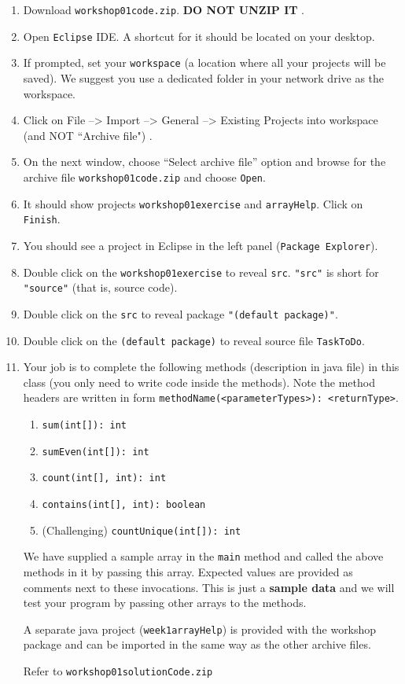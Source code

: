 \begin{questions}
\begin{enumerate}
	\itemsep0.3em 
\item Download \texttt{workshop01code.zip}. \textbf{\color{red} DO NOT UNZIP IT} \color{black}.
\item Open \texttt{Eclipse} IDE. A shortcut for it should be located on your desktop.
\item If prompted, set your \texttt{workspace} (a location where all your projects will be saved). We suggest you use a dedicated folder in your network drive as the workspace.
\item Click on \color{blue} File --> Import --> General --> Existing Projects into workspace \color{red} (and NOT ``Archive file") \color{black}.
\item On the next window, choose ``Select archive file'' option and browse for the archive file \texttt{workshop01code.zip} and choose \texttt{Open}.
\item It should show projects \texttt{workshop01exercise} and \texttt{arrayHelp}. Click on \texttt{Finish}.
\item You should see a project in Eclipse in the left panel (\texttt{Package Explorer}).
\item Double click on the \texttt{workshop01exercise} to reveal \texttt{src}. \texttt{"src"} is short for \texttt{"source"} (that is, source code).
\item Double click on the \texttt{src} to reveal package \texttt{"(default package)"}.
\item Double click on the \texttt{(default package)} to reveal source file \texttt{TaskToDo}.
\item Your job is to complete the following methods (description in java file) in this class (you only need to write code inside the methods). Note the method headers are written in form \texttt{methodName(<parameterTypes>): <returnType>}.

\begin{enumerate}
\item \texttt{sum(int[]): int}
\item \texttt{sumEven(int[]): int}
\item \texttt{count(int[], int): int}
\item \texttt{contains(int[], int): boolean}
\item (Challenging) \texttt{countUnique(int[]): int}
\end{enumerate}

We have supplied a sample array in the \texttt{main} method and called the above methods in it by passing this array. Expected values are provided as comments next to these invocations. This is just a \textbf{sample data} and we will test your program by passing other arrays to the methods.

A separate java project (\texttt{week1arrayHelp}) is provided with the workshop package and can be imported in the same way as the other archive files.

\begin{solution}
Refer to \texttt{workshop01solutionCode.zip}	
\end{solution}
\end{enumerate}
\end{questions}

